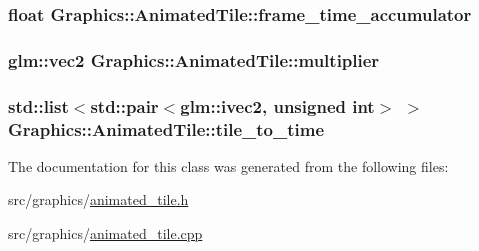 \subsubsection[{frame\+\_\+time\+\_\+accumulator}]{\setlength{\rightskip}{0pt plus 5cm}float Graphics\+::\+Animated\+Tile\+::frame\+\_\+time\+\_\+accumulator\hspace{0.3cm}{\ttfamily [private]}}\label{class_graphics_1_1_animated_tile_a77a84617edf89f6b1576d4745bdd5d13}
\hypertarget{class_graphics_1_1_animated_tile_a6ceae6448ee26d0cd1b489795c55eb22}{}
\subsubsection[{multiplier}]{\setlength{\rightskip}{0pt plus 5cm}glm\+::vec2 Graphics\+::\+Animated\+Tile\+::multiplier\hspace{0.3cm}{\ttfamily [private]}}\label{class_graphics_1_1_animated_tile_a6ceae6448ee26d0cd1b489795c55eb22}
\hypertarget{class_graphics_1_1_animated_tile_a4d02a9bdd7576d1228b9ddf3eadec65c}{}
\subsubsection[{tile\+\_\+to\+\_\+time}]{\setlength{\rightskip}{0pt plus 5cm}std\+::list$<$std\+::pair$<$glm\+::ivec2, unsigned int$>$ $>$ Graphics\+::\+Animated\+Tile\+::tile\+\_\+to\+\_\+time\hspace{0.3cm}{\ttfamily [private]}}\label{class_graphics_1_1_animated_tile_a4d02a9bdd7576d1228b9ddf3eadec65c}


The documentation for this class was generated from the following files\+:\begin{DoxyCompactItemize}
\item 
src/graphics/\hyperlink{animated__tile_8h}{animated\+\_\+tile.\+h}\item 
src/graphics/\hyperlink{animated__tile_8cpp}{animated\+\_\+tile.\+cpp}\end{DoxyCompactItemize}

